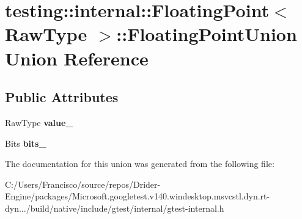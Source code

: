 \hypertarget{uniontesting_1_1internal_1_1_floating_point_1_1_floating_point_union}{}\section{testing\+:\+:internal\+:\+:Floating\+Point$<$ Raw\+Type $>$\+:\+:Floating\+Point\+Union Union Reference}
\label{uniontesting_1_1internal_1_1_floating_point_1_1_floating_point_union}
\subsection*{Public Attributes}
\begin{DoxyCompactItemize}
\item 
\mbox{\label{uniontesting_1_1internal_1_1_floating_point_1_1_floating_point_union_a4ee324889f70577721393e8e1920e4c6}} 
Raw\+Type {\bfseries value\+\_\+}
\item 
\mbox{\label{uniontesting_1_1internal_1_1_floating_point_1_1_floating_point_union_aedb69e386f5d624a016f7a781302a2bf}} 
Bits {\bfseries bits\+\_\+}
\end{DoxyCompactItemize}


The documentation for this union was generated from the following file\+:\begin{DoxyCompactItemize}
\item 
C\+:/\+Users/\+Francisco/source/repos/\+Drider-\/\+Engine/packages/\+Microsoft.\+googletest.\+v140.\+windesktop.\+msvcstl.\+dyn.\+rt-\/dyn.../build/native/include/gtest/internal/gtest-\/internal.\+h\end{DoxyCompactItemize}
